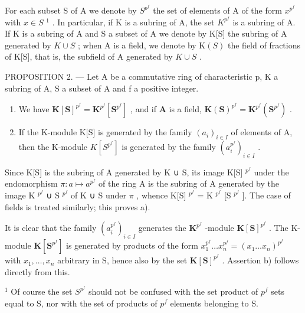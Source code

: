 For each subset S of A we denote by \(S^{p^{f}}\) the set of elements of A of the form \(x^{p^{f}}\) with \(x \in S\) \(^{1}\) . In particular, if K is a subring of A, the set \(K^{p^{f}}\) is a subring of A. If K is a subring of A and S a subset of A we denote by K{[}S{]} the subring of A generated by \(K \cup S\) ; when A is a field, we denote by \(\mathrm{K}(S)\) the field of fractions of K{[}S{]}, that is, the subfield of A generated by \(K \cup S\) .

PROPOSITION 2. --- Let A be a commutative ring of characteristic p, K a subring of A, S a subset of A and f a positive integer.

\begin{enumerate}
\def\labelenumi{\alph{enumi})}
\item
  We have \(\mathbf{K}[\mathbf{S}]^{p^f} = \mathbf{K}^{p^f}[\mathbf{S}^{p^f}]\) , and if \(\mathbf{A}\) is a field, \(\mathbf{K}(\mathbf{S})^{p^f} = \mathbf{K}^{p^f}(\mathbf{S}^{p^f})\) .
\item
  If the K-module K{[}S{]} is generated by the family \((a_{i})_{i\in I}\) of elements of A, then the K-module \(K[S^{p^{f}}]\) is generated by the family \((a_{i}^{p^{f}})_{i\in I}\) .
\end{enumerate}

Since K{[}S{]} is the subring of A generated by K ∪ S, its image K{[}S{]} \(^{p^{f}}\) under the endomorphism \(\pi: a \mapsto a^{p^{f}}\) of the ring A is the subring of A generated by the image K \(^{p^{f}}\) ∪ S \(^{p^{f}}\) of K ∪ S under \(\pi\) , whence K{[}S{]} \(^{p^{f}}\) = K \(^{p^{f}}\) {[}S \(^{p^{f}}\) {]}. The case of fields is treated similarly; this proves a).

It is clear that the family \((a_i^{p^f})_{i\in I}\) generates the \(\mathbf{K}^{p^f}\) -module \(\mathbf{K}[\mathbf{S}]^{p^f}\) . The K-module \(\mathbf{K}[\mathbf{S}^{p^f}]\) is generated by products of the form \(x_1^{p^f}\ldots x_n^{p^f} = (x_1\ldots x_n)^{p^f}\) with \(x_1,\ldots ,x_n\) arbitrary in S, hence also by the set \(\mathbf{K}[\mathbf{S}]^{p^f}\) . Assertion b) follows directly from this.

\(^{1}\) Of course the set \(S^{p^{f}}\) should not be confused with the set product of \(p^{f}\) sets equal to S, nor with the set of products of \(p^{f}\) elements belonging to S.

